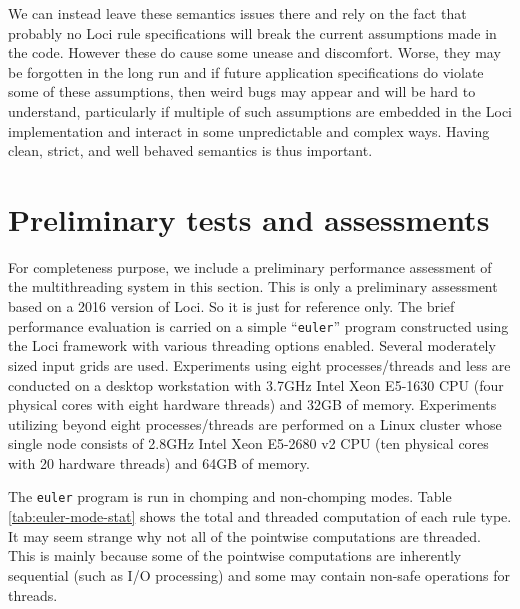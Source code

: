 \documentclass{article}
\begin{document}
We can instead leave these semantics issues there and rely on the fact
that probably no Loci rule specifications will break the current
assumptions made in the code.  However these do cause some unease and
discomfort.  Worse, they may be forgotten in the long run and if future
application specifications do violate some of these assumptions, then
weird bugs may appear and will be hard to understand, particularly if
multiple of such assumptions are embedded in the Loci implementation and
interact in some unpredictable and complex ways.  Having clean, strict,
and well behaved semantics is thus important.

\section{Preliminary tests and assessments}
\label{sec:perf}
For completeness purpose, we include a preliminary performance
assessment of the multithreading system in this section.  This is only a
preliminary assessment based on a 2016 version of Loci.  So it is just
for reference only.  The brief performance evaluation is carried on a
simple ``\texttt{euler}'' program constructed using the Loci framework
with various threading options enabled.  Several moderately sized input
grids are used.  Experiments using eight processes/threads and less are
conducted on a desktop workstation with 3.7GHz Intel Xeon E5-1630 CPU
(four physical cores with eight hardware threads) and 32GB of memory.
Experiments utilizing beyond eight processes/threads are performed on a
Linux cluster whose single node consists of 2.8GHz Intel Xeon E5-2680 v2
CPU (ten physical cores with 20 hardware threads) and 64GB of memory.

The \texttt{euler} program is run in chomping and non-chomping modes.
Table \ref{tab:euler-mode-stat} shows the total and threaded computation
of each rule type.  It may seem strange why not all of the pointwise
computations are threaded.  This is mainly because some of the
pointwise computations are inherently sequential (such as I/O
processing) and some may contain non-safe operations for threads.
\end{document}
